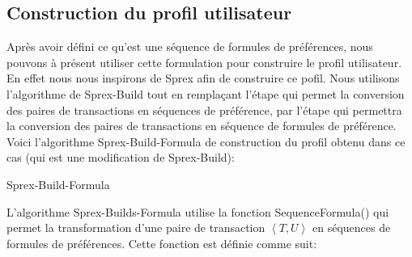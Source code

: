 \documentclass[a4paper,12pt,openany,oneside]{article}
\begin{document}
\bigskip
	
       





 
        
     \subsection{Construction du profil utilisateur}

Après avoir défini ce qu'est une séquence de formules de préférences, nous pouvons à présent utiliser cette formulation pour construire le profil utilisateur. En effet nous nous inspirons de Sprex afin de construire ce pofil. Nous utilisons l'algorithme de Sprex-Build tout en remplaçant l'étape qui permet la conversion des paires de transactions en séquences de préférence, par l'étape qui permettra la conversion des paires de transactions en séquence de formules de préférence.\\

Voici l'algorithme Sprex-Build-Formula de construction du profil obtenu dans ce cas (qui est une modification de Sprex-Build):\\



\begin{algorithm}[H]
 	   	
	\caption{Sprex-Build-Formula}
\end{algorithm}

L'algorithme Sprex-Builds-Formula utilise la fonction SequenceFormula() qui permet la transformation d'une paire de transaction $\left< T, U\right>$ en séquences de formules de préférences. Cette fonction est définie comme suit:\\
\end{document}
